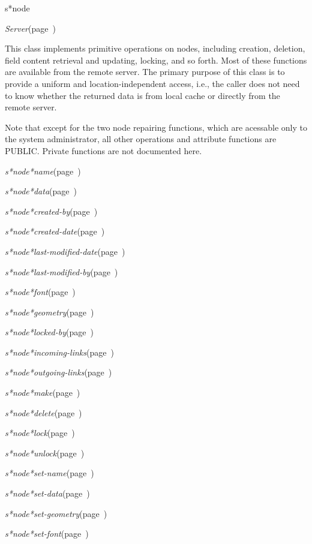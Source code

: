 \begin{description}
\item [Name:]  s*node

\item [Layer:] {\sl Server}\hfill(page~\pageref{Server})

\item [Description:]
This class implements primitive operations on nodes, including
creation, deletion, field content retrieval and updating,
locking, and so forth. Most of these functions are available from
the remote server. The primary purpose of this class is to
provide a uniform and location-independent access, i.e., the
caller does not need to know whether the returned data is from
local cache or directly from the remote server.

Note that except for the two node repairing functions, which are
acessable only to the system administrator, all other operations
and attribute functions are PUBLIC. Private functions are not
documented here.

\item [Attributes:]
\item {\sl s*node*name}\hfill(page~\pageref{s*node*name})
\item {\sl s*node*data}\hfill(page~\pageref{s*node*data})
\item {\sl s*node*created-by}\hfill(page~\pageref{s*node*created-by})
\item {\sl s*node*created-date}\hfill(page~\pageref{s*node*created-date})
\item {\sl s*node*last-modified-date}\hfill(page~\pageref{s*node*last-modified-date})
\item {\sl s*node*last-modified-by}\hfill(page~\pageref{s*node*last-modified-by})
\item {\sl s*node*font}\hfill(page~\pageref{s*node*font})
\item {\sl s*node*geometry}\hfill(page~\pageref{s*node*geometry})
\item {\sl s*node*locked-by}\hfill(page~\pageref{s*node*locked-by})
\item {\sl s*node*incoming-links}\hfill(page~\pageref{s*node*incoming-links})
\item {\sl s*node*outgoing-links}\hfill(page~\pageref{s*node*outgoing-links})

\item [Operations:]
\item {\sl s*node*make}\hfill(page~\pageref{s*node*make})
\item {\sl s*node*delete}\hfill(page~\pageref{s*node*delete})
\item {\sl s*node*lock}\hfill(page~\pageref{s*node*lock})
\item {\sl s*node*unlock}\hfill(page~\pageref{s*node*unlock})
\item {\sl s*node*set-name}\hfill(page~\pageref{s*node*set-name})
\item {\sl s*node*set-data}\hfill(page~\pageref{s*node*set-data})
\item {\sl s*node*set-geometry}\hfill(page~\pageref{s*node*set-geometry})
\item {\sl s*node*set-font}\hfill(page~\pageref{s*node*set-font})


\end{description}
